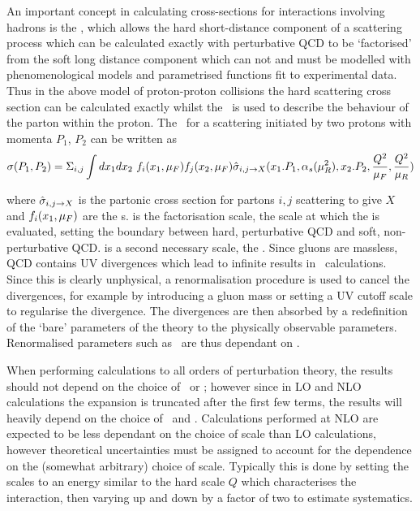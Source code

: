 An important concept in calculating cross-sections for interactions involving
hadrons is the , which allows the hard
short-distance component of a scattering process which can be calculated
exactly with perturbative QCD to be `factorised' from the soft long distance component which can
not and must be modelled with phenomenological models and parametrised functions
fit to experimental data. Thus in the above model of proton-proton collisions
the hard scattering cross section can be calculated exactly whilst the
\partDF\ is used to describe the behaviour of the parton within the proton. The
\cx\ for a scattering initiated by two protons with momenta $P_{1}$, $P_{2}$ can
be written as~\cite{qcd-collider-physics}
\begin{equation}
\sigma(P_{1}, P_{2}) = \Sigma_{i,j} \int dx_{1} dx_{2} \  f_{i}(x_{1}, \mu_{F})
f_{j}(x_{2}, \mu_{F}) \hat{\sigma}_{i,j\rightarrow X} (x_{1}.P_{1}, \alpha_{s}(\mu_{R}^{2}), x_{2}.P_{2},
\frac{Q^{2}}{\mu_{F}}, \frac{Q^{2}}{\mu_{R}})
\end{equation}

where $\hat{\sigma}_{i,j\rightarrow X}$ is the partonic cross section for partons $i,j$
scattering to give $X$ and  $f_{i}(x_{1}, \mu_{F})$ are the \partDF s. \uF is the
factorisation scale, the scale at which the \partDF is evaluated, setting the boundary between hard, perturbative QCD and
soft, non-perturbative QCD. \uR is a second necessary scale, the
. Since gluons are massless, QCD contains UV
divergences which lead to infinite results in \cx\ calculations. Since 
this is clearly unphysical, a renormalisation procedure is used to cancel the
divergences, for example by introducing a gluon mass or setting a UV cutoff
scale to regularise the divergence. The divergences are then absorbed by a
redefinition of the `bare' parameters of the theory to the physically observable
parameters. Renormalised parameters such as \alphaS\ are thus dependant on \uR.


When performing calculations to all orders of perturbation theory, the results
should not depend on the choice of \uR\ or \uF; however since in LO and NLO
calculations the expansion is truncated after the
first few terms,  the results will heavily depend on
the choice of \uR\ and \uF. Calculations performed at NLO are expected to
be less dependant on the choice of scale than LO calculations, however
theoretical uncertainties must be assigned to account for the dependence on the
(somewhat arbitrary) choice of scale. Typically this is done by setting the
scales to an energy similar to the hard scale $Q$ which characterises the interaction, then
varying up and down by a factor of two to estimate systematics.

